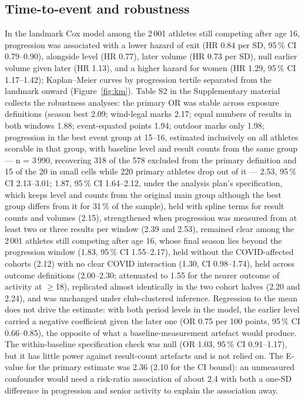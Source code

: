 \documentclass[12pt,a4paper]{article}
\begin{document}
\subsection{Time-to-event and robustness}

In the landmark Cox model among the 2\,001 athletes still competing after age 16, progression was associated with a lower hazard of exit (HR 0.84 per SD, 95\,\% CI 0.79--0.90), alongside level (HR 0.77), later volume (HR 0.73 per SD), null earlier volume given later (HR 1.13), and a higher hazard for women (HR 1.29, 95\,\% CI 1.17--1.42); Kaplan--Meier curves by progression tertile separated from the landmark onward (Figure~\ref{fig:km}). Table S2 in the Supplementary material collects the robustness analyses: the primary OR was stable across exposure definitions (season best 2.09; wind-legal marks 2.17; equal numbers of results in both windows 1.88; event-equated points 1.94; outdoor marks only 1.98; progression in the best event group at 15--16, estimated inclusively on all athletes scorable in that group, with baseline level and result counts from the same group --- n = 3\,990, recovering 318 of the 578 excluded from the primary definition and 15 of the 20 in small cells while 220 primary athletes drop out of it --- 2.53, 95\,\% CI 2.13--3.01; 1.87, 95\,\% CI 1.64--2.12, under the analysis plan's specification, which keeps level and counts from the original main group although the best group differs from it for 31\,\% of the sample), held with spline terms for result counts and volumes (2.15), strengthened when progression was measured from at least two or three results per window (2.39 and 2.53), remained clear among the 2\,001 athletes still competing after age 16, whose final season lies beyond the progression window (1.83, 95\,\% CI 1.55--2.17), held without the COVID-affected cohorts (2.12) with no clear COVID interaction (1.30, CI 0.98--1.74), held across outcome definitions (2.00--2.30; attenuated to 1.55 for the nearer outcome of activity at $\geq$18), replicated almost identically in the two cohort halves (2.20 and 2.24), and was unchanged under club-clustered inference. Regression to the mean does not drive the estimate: with both period levels in the model, the earlier level carried a negative coefficient given the later one (OR 0.75 per 100 points, 95\,\% CI 0.66--0.85), the opposite of what a baseline-measurement artefact would produce. The within-baseline specification check was null (OR 1.03, 95\,\% CI 0.91--1.17), but it has little power against result-count artefacts and is not relied on. The E-value for the primary estimate was 2.36 (2.10 for the CI bound): an unmeasured confounder would need a risk-ratio association of about 2.4 with both a one-SD difference in progression and senior activity to explain the association away.
\end{document}
